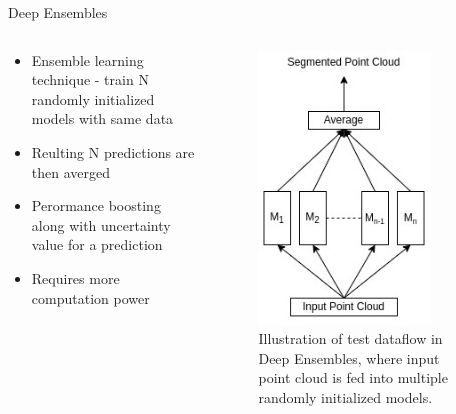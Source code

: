 \documentclass[aspectratio=169]{beamer}
\begin{document}
\begin{frame}{Deep Ensembles}
    \begin{columns}
        \begin{column}{0.5\textwidth}
            \begin{itemize}
                \item Ensemble learning technique - train N randomly initialized models with same data
                \item Reulting N predictions are then averged
                \item Perormance boosting along with uncertainty value for a prediction
                \item Requires more computation power
            \end{itemize}
        \end{column}
        \begin{column}{0.5\textwidth}
            \begin{figure}
                \centering
                \includegraphics[scale=0.5]{images/deep_ensembles.jpg}
                \caption{Illustration of test dataflow in Deep Ensembles, where input point cloud is fed into multiple
                randomly initialized models.}
                \label{fig:deep_ensembles_work}    
            \end{figure}
        \end{column}
    \end{columns}
\end{frame}
\end{document}
